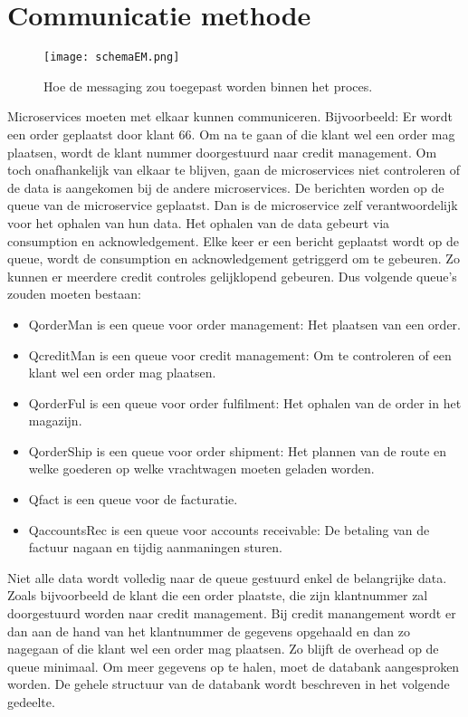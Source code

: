 \section{Communicatie methode}
\begin{figure}[h]
	\texttt{[image: schemaEM.png]}
	\caption{Hoe de messaging zou toegepast worden binnen het proces.}
	\centering
\end{figure}
Microservices moeten met elkaar kunnen communiceren. Bijvoorbeeld: Er wordt een order geplaatst door klant 66. Om na te gaan of die klant wel een order mag plaatsen, wordt de klant nummer doorgestuurd naar credit management. Om toch onafhankelijk van elkaar te blijven, gaan de microservices niet controleren of de data is aangekomen bij de andere microservices. De berichten worden op de queue van de microservice geplaatst. Dan is de microservice zelf verantwoordelijk voor het ophalen van hun data. Het ophalen van de data gebeurt via consumption en acknowledgement. Elke keer er een bericht geplaatst wordt op de queue, wordt de consumption en acknowledgement getriggerd om te gebeuren. Zo kunnen er meerdere credit controles gelijklopend gebeuren. 
Dus volgende queue's zouden moeten bestaan:
\begin{itemize}
	\item QorderMan is een queue voor order management: Het plaatsen van een order.
	\item QcreditMan is een queue voor credit management: Om te controleren of een klant wel een order mag plaatsen.
	\item QorderFul is een queue voor order fulfilment: Het ophalen van de order in het magazijn.
	\item QorderShip is een queue voor order shipment: Het plannen van de route en welke goederen op welke vrachtwagen moeten geladen worden.
	\item Qfact is een queue voor de facturatie.
	\item QaccountsRec is een queue voor accounts receivable: De betaling van de factuur nagaan en tijdig aanmaningen sturen. 
\end{itemize}

Niet alle data wordt volledig naar de queue gestuurd enkel de belangrijke data. Zoals bijvoorbeeld de klant die een order plaatste, die zijn klantnummer zal doorgestuurd worden naar credit management. Bij credit manangement wordt er dan aan de hand van het klantnummer de gegevens opgehaald en dan zo nagegaan of die klant wel een order mag plaatsen. Zo blijft de overhead op de queue minimaal. Om meer gegevens op te halen, moet de databank aangesproken worden. De gehele structuur van de databank wordt beschreven in het volgende gedeelte.

